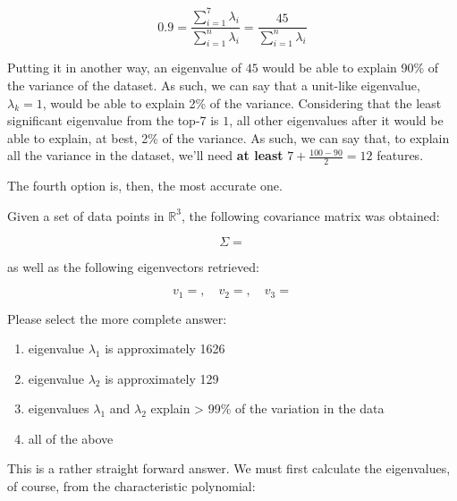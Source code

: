 \documentclass[12pt]{article}
\begin{document}
\begin{enumerate}[leftmargin=\labelsep]
  \begin{equation*}
    0.9 = \frac{\sum_{i=1}^7 \lambda_i}{\sum_{i=1}^n \lambda_i} = \frac{45}{\sum_{i=1}^n \lambda_i}
  \end{equation*}

  Putting it in another way, an eigenvalue of $45$ would be able to explain
  90\% of the variance of the dataset. As such, we can say that a unit-like
  eigenvalue, $\lambda_k = 1$, would be able to explain 2\% of the variance.
  Considering that the least significant eigenvalue from the top-7 is $1$,
  all other eigenvalues after it would be able to explain, at best, 2\% of the
  variance. As such, we can say that, to explain all the variance in the dataset,
  we'll need \textbf{at least} $7 + \frac{100 - 90}{2} = 12$ features.

  The fourth option is, then, the most accurate one.

  \begin{tcolorbox}[enhanced jigsaw,halign=center,colback=bg,boxrule=0pt,arc=1pt]
    \item Given a set of data points in $\mathbb{R}^3$, the following covariance
    matrix was obtained:

    \begin{equation*}
      \Sigma = 
    \end{equation*}

    as well as the following eigenvectors retrieved:

    \begin{equation*}
      v_1 = , \quad v_2 = , \quad v_3 = 
    \end{equation*}

    Please select the more complete answer:

    \begin{enumerate}
      \item eigenvalue $\lambda_1$ is approximately 1626
      \item eigenvalue $\lambda_2$ is approximately 129
      \item eigenvalues $\lambda_1$ and $\lambda_2$ explain > 99\% of the variation in the data
      \item all of the above
    \end{enumerate}
  \end{tcolorbox}

  This is a rather straight forward answer. We must first calculate the
  eigenvalues, of course, from the characteristic polynomial:


\end{enumerate}
\end{document}
